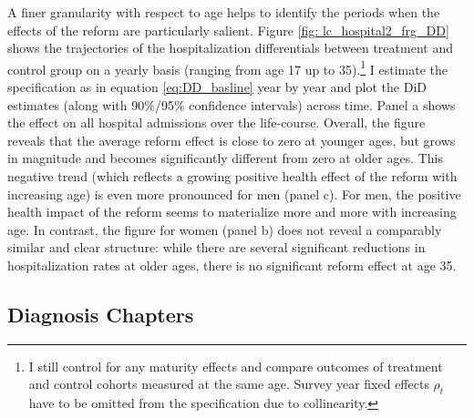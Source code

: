 \documentclass[11pt, a4paper,draft]{article} %
\begin{document}
A finer granularity with respect to age helps to identify the periods when the effects of the reform are particularly salient. Figure \ref{fig: lc_hospital2_frg_DD} shows the trajectories of the hospitalization differentials between treatment and control group on a yearly basis (ranging from age 17 up to 35).\footnote{I still control for any maturity effects and compare outcomes of treatment and control cohorts measured at the same age. Survey year fixed effects $\rho_t$ have to be omitted from the specification due to collinearity.} I estimate the specification as in equation \ref{eq:DD_basline} year by year and plot the DiD estimates (along with 90\%/95\% confidence intervals) across time. Panel a shows the effect on all hospital admissions over the life-course. Overall, the figure reveals that the average reform effect is close to zero at younger ages, but grows in magnitude and becomes significantly different from zero at older ages. This negative trend (which reflects a growing positive health effect of the reform with increasing age) is even more pronounced for men (panel c). For men, the positive health impact of the reform seems to materialize more and more with increasing age. In contrast, the figure for women (panel b) does not reveal a comparably similar and clear structure: while there are several significant reductions in hospitalization rates at older ages, there is no significant reform effect at age 35.\newline




\subsection{Diagnosis Chapters}
\end{document}
